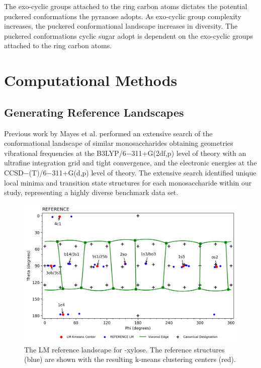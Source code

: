 \documentclass{article}
\begin{document}
The exo-cyclic groups attached to the ring carbon atoms dictates the potential puckered conformations the pyranose adopts. As exo-cyclic group complexity 
increases, the puckered conformational landscape increases in diversity. The puckered conformations cyclic sugar adopt is dependent on the exo-cyclic groups
attached to the ring carbon atoms. 


\newpage
\section{Computational Methods}

\subsection{Generating Reference Landscapes}
Previous work by Mayes et al. performed an extensive search of the conformational landscape of similar monosaccharides obtaining geometries 
vibrational frequencies at the B3LYP/6$-$311+G(2df,p) level of theory with an ultrafine integration grid and tight convergence, and the electronic 
energies at the CCSD$-$(T)/6$-$311+G(d,p) level of theory.\cite{Mayes2014}  The extensive search identified unique local minima and transition
state structures for each monosaccharide within our study, representing a highly diverse benchmark data set.	

\begin{figure}[H]
  	\centering
  	\includegraphics[width=\textwidth,height=\textheight,keepaspectratio]
	{figures/bxyl/overall/z_dataset-bxyl-LM-REFERENCE-all_groupings.png}
	\caption{The LM reference landscape for \textbeta-xylose. The reference structures (blue) are shown with the resulting k-means clustering
	centers (red).}
 	\label{fig:spherical_kmeans_lm}
\end{figure}
\end{document}

